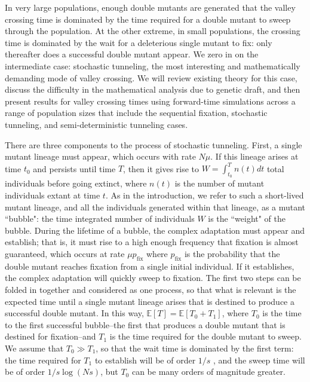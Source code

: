 \documentclass[10pt,twocolumn,twoside]{gsajnl}
\newcommand{\pfix}{p_{\mathrm{fix}}}
\begin{document}
\begin{spacing}{1.5}
In very large populations, enough double mutants are generated that the valley crossing time is dominated by the time required for a double mutant to sweep through the population.
At the other extreme, in small populations, the crossing time is dominated by the wait for a deleterious single mutant to fix: only thereafter does a successful double mutant appear.
We zero in on the intermediate case: stochastic tunneling, the most interesting and mathematically demanding mode of valley crossing.
We will review existing theory for this case, discuss the difficulty in the mathematical analysis due to genetic draft, and then present results for valley crossing times using forward-time simulations across a range of population sizes that include the sequential fixation, stochastic tunneling, and semi-deterministic tunneling cases.

There are three components to the process of stochastic tunneling.
First, a single mutant lineage must appear, which occurs with rate $N\mu$.
If this lineage arises at time $t_0$ and persists until time $T$, then it gives rise to $W = \int_{t_0}^T n(t) dt$ total individuals before going extinct, where $n(t)$ is the number of mutant individuals extant at time $t$.
As in the introduction, we refer to such a short-lived mutant lineage, and all the individuals generated within that lineage, as a mutant ``bubble": the time integrated number of individuals $W$ is the ``weight" of the bubble.
During the lifetime of a bubble, the complex adaptation must appear and establish; that is, it must rise to a high enough frequency that fixation is almost guaranteed, which occurs at rate $\mu \pfix$ where $\pfix$ is the probability that the double mutant reaches fixation from a single initial individual.
If it establishes, the complex adaptation will quickly sweep to fixation.
The first two steps can be folded in together and considered as one process, so that what is relevant is the expected time until a single mutant lineage arises that is destined to produce a successful double mutant.
In this way, $\mathbb{E}\left[ T \right] = \mathbb{E} \left[ T_0 + T_1 \right]$, where $T_0$ is the time to the first successful bubble--the first that produces a double mutant that is destined for fixation--and $T_1$ is the time required for the double mutant to sweep.
We assume that $T_0 \gg T_1$, so that the wait time is dominated by the first term: the time required for $T_1$ to establish will be of order $1/s$ \citep{desai_fisher_2007}, and the sweep time will be of order $1/s \log (Ns)$, but $T_0$ can be many orders of magnitude greater.


\end{spacing}
\end{document}
